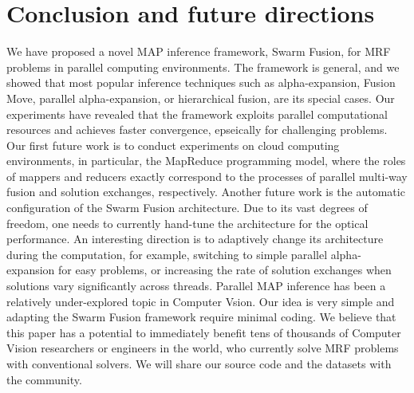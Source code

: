 \section{Conclusion and future directions}
We have proposed a novel MAP inference framework, Swarm Fusion, for MRF
problems in parallel computing environments. The framework is general,
and we showed that most popular inference techniques such as
alpha-expansion, Fusion Move, parallel alpha-expansion, or hierarchical
fusion, are its special cases. Our experiments have revealed that the
framework exploits parallel computational resources and achieves faster
convergence, epseically for challenging problems.  Our first future work
is to conduct experiments on cloud computing environments, in
particular, the MapReduce programming model, where the roles of mappers
and reducers exactly correspond to the processes of parallel multi-way
fusion and solution exchanges, respectively.  Another future work is the
automatic configuration of the Swarm Fusion architecture. Due to its
vast degrees of freedom, one needs to currently hand-tune the
architecture for the optical performance. An interesting direction is to
adaptively change its architecture during the computation, for example,
switching to simple parallel alpha-expansion for easy problems, or
increasing the rate of solution exchanges when solutions vary
significantly across threads.
%
Parallel MAP inference has been a relatively under-explored topic in
Computer Vsion. Our idea is very simple and adapting the Swarm Fusion
framework require minimal coding. We believe that this paper has a
potential to immediately benefit tens of thousands of Computer Vision
researchers or engineers in the world, who currently solve MRF problems
with conventional solvers. We will share our source code and the
datasets with the community.
